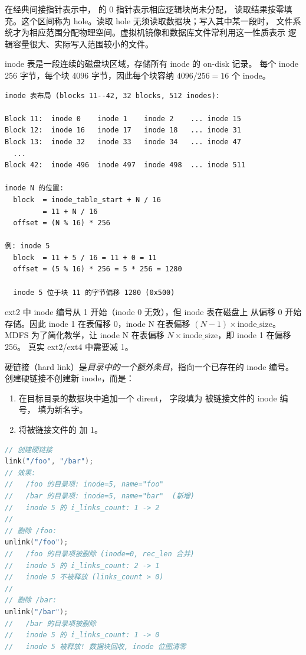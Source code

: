 \begin{filesystemlayout}
在经典间接指针表示中， 的 0 指针表示相应逻辑块尚未分配，
读取结果按零填充。这个区间称为 hole。读取 hole 无须读取数据块；写入其中某一段时，
文件系统才为相应范围分配物理空间。虚拟机镜像和数据库文件常利用这一性质表示
逻辑容量很大、实际写入范围较小的文件。


inode 表是一段连续的磁盘块区域，存储所有 inode 的 on-disk 记录。
每个 inode 256 字节，每个块 4096 字节，因此每个块容纳
$4096 / 256 = 16$ 个 inode。

\begin{lstlisting}
inode 表布局 (blocks 11--42, 32 blocks, 512 inodes):

Block 11:  inode 0    inode 1    inode 2    ... inode 15
Block 12:  inode 16   inode 17   inode 18   ... inode 31
Block 13:  inode 32   inode 33   inode 34   ... inode 47
  ...
Block 42:  inode 496  inode 497  inode 498  ... inode 511

inode N 的位置:
  block  = inode_table_start + N / 16
         = 11 + N / 16
  offset = (N % 16) * 256

例: inode 5
  block  = 11 + 5 / 16 = 11 + 0 = 11
  offset = (5 % 16) * 256 = 5 * 256 = 1280

  inode 5 位于块 11 的字节偏移 1280 (0x500)
\end{lstlisting}

\begin{warningbox}
ext2 中 inode 编号从 1 开始（inode 0 无效），但 inode 表在磁盘上
从偏移 0 开始存储。因此 inode 1 在表偏移 0，inode N 在表偏移
$(N-1) \times \text{inode\_size}$。MDFS 为了简化教学，让 inode N
在表偏移 $N \times \text{inode\_size}$，即 inode 1 在偏移 256。
真实 ext2/ext4 中需要减 1。
\end{warningbox}



硬链接（hard link）是\emph{目录中的一个额外条目}，指向一个已存在的
inode 编号。创建硬链接不创建新 inode，而是：

\begin{enumerate}\tightlist
\item 在目标目录的数据块中追加一个 dirent， 字段填为
  被链接文件的 inode 编号， 填为新名字。
\item 将被链接文件的  加 1。
\end{enumerate}

\begin{lstlisting}[language=C]
// 创建硬链接
link("/foo", "/bar");
// 效果:
//   /foo 的目录项: inode=5, name="foo"
//   /bar 的目录项: inode=5, name="bar"  (新增)
//   inode 5 的 i_links_count: 1 -> 2
//
// 删除 /foo:
unlink("/foo");
//   /foo 的目录项被删除 (inode=0, rec_len 合并)
//   inode 5 的 i_links_count: 2 -> 1
//   inode 5 不被释放 (links_count > 0)
//
// 删除 /bar:
unlink("/bar");
//   /bar 的目录项被删除
//   inode 5 的 i_links_count: 1 -> 0
//   inode 5 被释放! 数据块回收, inode 位图清零
\end{lstlisting}


\end{filesystemlayout}
